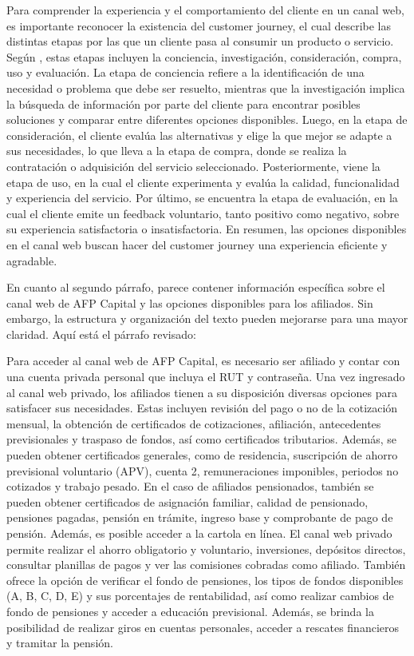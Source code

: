 Para comprender la experiencia y el comportamiento del cliente en un canal web, es importante reconocer la existencia del customer journey, el cual describe las distintas etapas por las que un cliente pasa al consumir un producto o servicio. Según \cite{lemon2016customer}, estas etapas incluyen la conciencia, investigación, consideración, compra, uso y evaluación. La etapa de conciencia refiere a la identificación de una necesidad o problema que debe ser resuelto, mientras que la investigación implica la búsqueda de información por parte del cliente para encontrar posibles soluciones y comparar entre diferentes opciones disponibles. Luego, en la etapa de consideración, el cliente evalúa las alternativas y elige la que mejor se adapte a sus necesidades, lo que lleva a la etapa de compra, donde se realiza la contratación o adquisición del servicio seleccionado. Posteriormente, viene la etapa de uso, en la cual el cliente experimenta y evalúa la calidad, funcionalidad y experiencia del servicio. Por último, se encuentra la etapa de evaluación, en la cual el cliente emite un feedback voluntario, tanto positivo como negativo, sobre su experiencia satisfactoria o insatisfactoria. En resumen, las opciones disponibles en el canal web buscan hacer del customer journey una experiencia eficiente y agradable.

En cuanto al segundo párrafo, parece contener información específica sobre el canal web de AFP Capital y las opciones disponibles para los afiliados. Sin embargo, la estructura y organización del texto pueden mejorarse para una mayor claridad. Aquí está el párrafo revisado:

Para acceder al canal web de AFP Capital, es necesario ser afiliado y contar con una cuenta privada personal que incluya el RUT y contraseña. Una vez ingresado al canal web privado, los afiliados tienen a su disposición diversas opciones para satisfacer sus necesidades. Estas incluyen revisión del pago o no de la cotización mensual, la obtención de certificados de cotizaciones, afiliación, antecedentes previsionales y traspaso de fondos, así como certificados tributarios. Además, se pueden obtener certificados generales, como de residencia, suscripción de ahorro previsional voluntario (APV), cuenta 2, remuneraciones imponibles, periodos no cotizados y trabajo pesado. En el caso de afiliados pensionados, también se pueden obtener certificados de asignación familiar, calidad de pensionado, pensiones pagadas, pensión en trámite, ingreso base y comprobante de pago de pensión. Además, es posible acceder a la cartola en línea. El canal web privado permite realizar el ahorro obligatorio y voluntario, inversiones, depósitos directos, consultar planillas de pagos y ver las comisiones cobradas como afiliado. También ofrece la opción de verificar el fondo de pensiones, los tipos de fondos disponibles (A, B, C, D, E) y sus porcentajes de rentabilidad, así como realizar cambios de fondo de pensiones y acceder a educación previsional. Además, se brinda la posibilidad de realizar giros en cuentas personales, acceder a rescates financieros y tramitar la pensión.